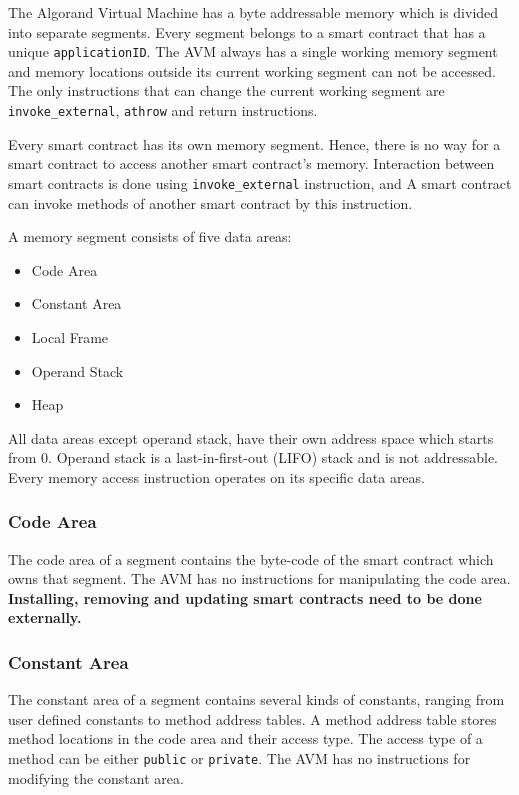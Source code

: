 \documentclass[11pt]{article}
\begin{document}
    The Algorand Virtual Machine has a byte addressable memory which is divided into separate segments.
    Every segment belongs to a smart contract that has a unique \texttt{applicationID}.
    The AVM always has a single working memory segment and memory locations outside its current working segment can
    not be accessed.
    The only instructions that can change the current working segment are \texttt{invoke\_external}, \texttt{athrow} and
    return instructions.

    Every smart contract has its own memory segment.
    Hence, there is no way for a smart contract to access another smart contract's memory.
    Interaction between smart contracts is done using \texttt{invoke\_external} instruction, and A smart contract can
    invoke methods of another smart contract by this instruction.

    A memory segment consists of five data areas:
    \begin{itemize}
        \item Code Area
        \item Constant Area
        \item Local Frame
        \item Operand Stack
        \item Heap
    \end{itemize}
    All data areas except operand stack, have their own address space which starts from 0.
    Operand stack is a last-in-first-out (LIFO) stack and is not addressable.
    Every memory access instruction operates on its specific data areas.

    \subsubsection{Code Area}

    The code area of a segment contains the byte-code of the smart contract which owns that segment.
    The AVM has no instructions for manipulating the code area.
    \textbf{Installing, removing and updating smart contracts need to be done externally.}

    \subsubsection{Constant Area}

    The constant area of a segment contains several kinds of constants, ranging from user defined constants to method
    address tables.
    A method address table stores method locations in the code area and their access type.
    The access type of a method can be either \texttt{public} or \texttt{private}.
    The AVM has no instructions for modifying the constant area.
\end{document}
